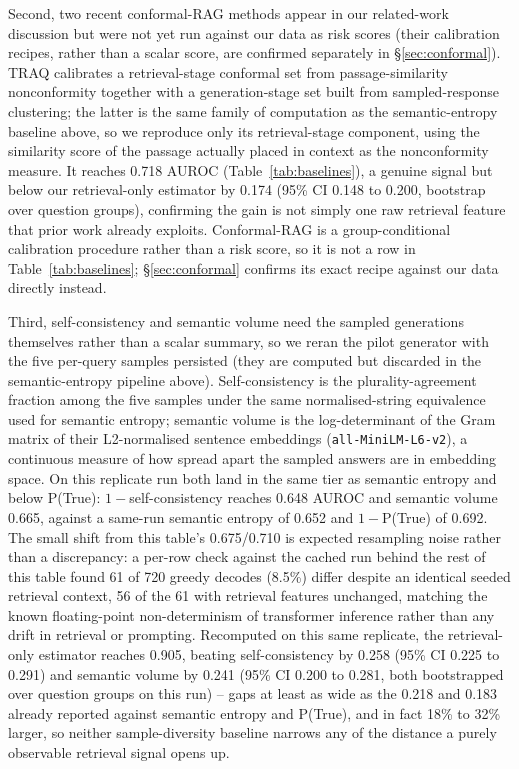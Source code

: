\documentclass[sn-basic]{sn-jnl}
\theoremstyle{thmstyleone}
\theoremstyle{thmstyletwo}
\begin{document}
Second, two recent conformal-RAG methods appear in our related-work
discussion but were not yet run against our data as risk scores (their
calibration recipes, rather than a scalar score, are confirmed separately
in \S\ref{sec:conformal}). TRAQ \citep{li2024traq} calibrates a
retrieval-stage conformal set from passage-similarity nonconformity together
with a generation-stage set built from sampled-response clustering; the
latter is the same family of computation as the semantic-entropy baseline
above, so we reproduce only its retrieval-stage component, using the
similarity score of the passage actually placed in context as the
nonconformity measure. It reaches 0.718 AUROC (Table~\ref{tab:baselines}), a
genuine signal but below our retrieval-only estimator by 0.174 (95\% CI
0.148 to 0.200, bootstrap over question groups), confirming the gain is not
simply one raw retrieval feature that prior work already exploits.
Conformal-RAG \citep{feng2025conformalrag} is a group-conditional
calibration procedure rather than a risk score, so it is not a row in
Table~\ref{tab:baselines}; \S\ref{sec:conformal} confirms its exact recipe
against our data directly instead.

Third, self-consistency \citep{wang2023selfconsistency} and semantic volume
\citep{li2026semanticvolume} need the sampled generations themselves rather
than a scalar summary, so we reran the pilot generator with the five
per-query samples persisted (they are computed but discarded in the
semantic-entropy pipeline above). Self-consistency is the plurality-agreement
fraction among the five samples under the same normalised-string equivalence
used for semantic entropy; semantic volume is the log-determinant of the
Gram matrix of their L2-normalised sentence embeddings
(\texttt{all-MiniLM-L6-v2}), a continuous measure of how spread apart the
sampled answers are in embedding space. On this replicate run both land in
the same tier as semantic entropy and below P(True): $1-$self-consistency
reaches 0.648 AUROC and semantic volume 0.665, against a same-run semantic
entropy of 0.652 and $1-$P(True) of 0.692. The small shift from this
table's 0.675/0.710 is expected resampling noise rather than a discrepancy:
a per-row check against the cached run behind the rest of this table found
61 of 720 greedy decodes (8.5\%) differ despite an identical seeded
retrieval context, 56 of the 61 with retrieval features unchanged, matching
the known floating-point non-determinism of transformer inference rather
than any drift in retrieval or prompting. Recomputed on this same replicate,
the retrieval-only estimator reaches 0.905, beating self-consistency by
0.258 (95\% CI 0.225 to 0.291) and semantic volume by 0.241 (95\% CI 0.200
to 0.281, both bootstrapped over question groups on this run) -- gaps at
least as wide as the 0.218 and 0.183 already reported against semantic
entropy and P(True), and in fact 18\% to 32\% larger, so neither
sample-diversity baseline narrows any of the distance a purely observable
retrieval signal opens up.
\end{document}
